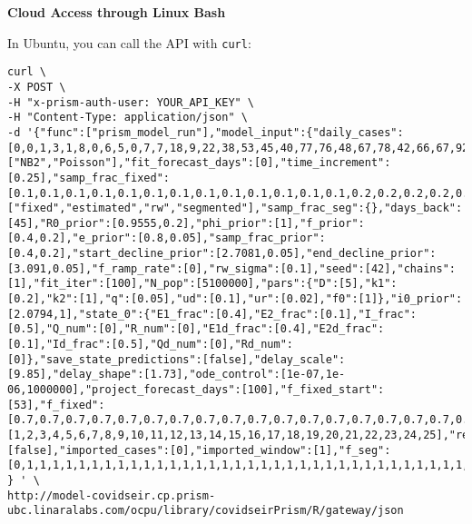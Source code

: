 \documentclass[
]{book}
\begin{document}
\textbf{Cloud Access through Linux Bash}

In Ubuntu, you can call the API with \texttt{curl}:

\begin{verbatim}
curl \
-X POST \
-H "x-prism-auth-user: YOUR_API_KEY" \
-H "Content-Type: application/json" \
-d '{"func":["prism_model_run"],"model_input":{"daily_cases":[0,0,1,3,1,8,0,6,5,0,7,7,18,9,22,38,53,45,40,77,76,48,67,78,42,66,67,92,16,70,43,53,55,53,29,26,37,25,45,34,40,35],"obs_model":["NB2","Poisson"],"fit_forecast_days":[0],"time_increment":[0.25],"samp_frac_fixed":[0.1,0.1,0.1,0.1,0.1,0.1,0.1,0.1,0.1,0.1,0.1,0.1,0.1,0.2,0.2,0.2,0.2,0.2,0.2,0.2,0.2,0.2,0.2,0.2,0.2,0.2,0.2,0.2,0.2,0.2,0.2,0.2,0.2,0.2,0.2,0.2,0.2,0.2,0.2,0.2,0.2,0.2],"samp_frac_type":["fixed","estimated","rw","segmented"],"samp_frac_seg":{},"days_back":[45],"R0_prior":[0.9555,0.2],"phi_prior":[1],"f_prior":[0.4,0.2],"e_prior":[0.8,0.05],"samp_frac_prior":[0.4,0.2],"start_decline_prior":[2.7081,0.05],"end_decline_prior":[3.091,0.05],"f_ramp_rate":[0],"rw_sigma":[0.1],"seed":[42],"chains":[1],"fit_iter":[100],"N_pop":[5100000],"pars":{"D":[5],"k1":[0.2],"k2":[1],"q":[0.05],"ud":[0.1],"ur":[0.02],"f0":[1]},"i0_prior":[2.0794,1],"state_0":{"E1_frac":[0.4],"E2_frac":[0.1],"I_frac":[0.5],"Q_num":[0],"R_num":[0],"E1d_frac":[0.4],"E2d_frac":[0.1],"Id_frac":[0.5],"Qd_num":[0],"Rd_num":[0]},"save_state_predictions":[false],"delay_scale":[9.85],"delay_shape":[1.73],"ode_control":[1e-07,1e-06,1000000],"project_forecast_days":[100],"f_fixed_start":[53],"f_fixed":[0.7,0.7,0.7,0.7,0.7,0.7,0.7,0.7,0.7,0.7,0.7,0.7,0.7,0.7,0.7,0.7,0.7,0.7,0.7,0.7,0.7,0.7,0.7,0.7,0.7,0.7,0.7,0.7,0.7,0.7,0.7,0.7,0.7,0.7,0.7,0.7,0.7,0.7,0.7,0.7,0.7,0.7,0.7,0.7,0.7,0.7,0.7,0.7,0.7,0.7,0.7,0.7,0.7,0.7,0.7,0.7,0.7,0.7,0.7,0.7,0.2,0.2,0.2,0.2,0.2,0.2,0.2,0.2,0.2,0.2,0.2,0.2,0.2,0.2,0.2,0.2,0.2,0.2,0.2,0.2,0.2,0.2,0.2,0.2,0.2,0.2,0.2,0.2,0.2,0.2],"forecast_iter":[1,2,3,4,5,6,7,8,9,10,11,12,13,14,15,16,17,18,19,20,21,22,23,24,25],"return_states":[false],"imported_cases":[0],"imported_window":[1],"f_seg":[0,1,1,1,1,1,1,1,1,1,1,1,1,1,1,1,1,1,1,1,1,1,1,1,1,1,1,1,1,1,1,1,1,1,1,1,1,1,1,1,1,1,1,1,1,1,1,1,1,1,1,1,1,1,1,1,1,1,1,1,1,1,1,1,1,1,1,1,1,1,1,1,1,1,1,1,1,1,1,1,1,1,1,1,1,1,1,1,1,1,1,1,1,1,1,1,1,1,1,1,1,1,1,1,1,1,1,1,1,1,1,1,1,1,1,1,1,1,1,1,1,1,1,1,1,1,1,1,1,1,1,1,1,1,1,1,1,1,1,1,1,1]} 
} ' \
http://model-covidseir.cp.prism-ubc.linaralabs.com/ocpu/library/covidseirPrism/R/gateway/json
\end{verbatim}

  
\end{document}
